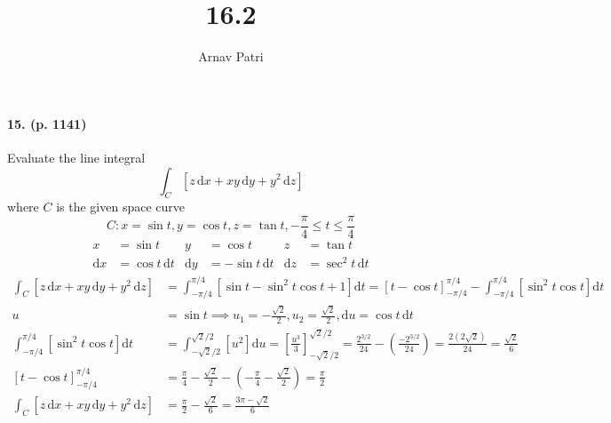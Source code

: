 \documentclass[A4, 12pt]{article}
\title{16.2}
\author{Arnav Patri}
\renewcommand{\d}{\mathrm{d}}
\begin{document}
	\maketitle
	\thispagestyle{empty}
	\paragraph{15. (p. 1141)}
		Evaluate the line integral
			\[\int_C\left[z\,\d x + xy\,\d y + y^2\,\d z\right]\]
			where $C$ is the given space curve
			\[C: x = \sin t, y = \cos t, z = \tan t, -\frac{\pi}{4} \le t \le \frac{\pi}{4}\]
		\begin{align*}
			x &= \sin t & y &= \cos t & z &= \tan t \\
			\d x &= \cos t\,\d t & \d y &= -\sin t\,\d t & \d z &= \sec^2 t\,\d t
		\end{align*}
		\begin{align*}
			\int_C\left[z\,\d x + xy\,\d y + y^2\,\d z\right] &= \int_{-\pi/4}^{\pi/4} \left[\sin t - \sin^2t\cos t+ 1\right]\d t
					= [t -\cos t]_{-\pi/4}^{\pi/4} - \int_{-\pi /4}^{\pi /4}\left[\sin^2 t\cos t\right]\d t \\
				u &= \sin t 
						\implies u_1 = -\frac{\sqrt{2}}{2}, u_2 = \frac{\sqrt{2}}{2}, \d u = \cos t\,\d t \\
				\int_{-\pi /4}^{\pi /4}\left[\sin^2 t\cos t\right]\d t &= \int_{-\sqrt{2}/2}^{\sqrt{2}/2} \left[u^2\right]\d u
						= \left[\frac{u^3}{3}\right]_{-\sqrt{2}/2}^{\sqrt{2}/2}
						= \frac{2^{3/2}}{24} - \left(\frac{-2^{3/2}}{24}\right)
						= \frac{2\left(2\sqrt{2}\right)}{24}
						= \frac{\sqrt{2}}{6} \\
				[t - \cos t]_{-\pi/4}^{\pi/4} &= \frac{\pi}{4} - \frac{\sqrt{2}}{2} - \left(-\frac{\pi}{4} - \frac{\sqrt{2}}{2}\right) 
				= \frac{\pi}{2} \\
			\int_C\left[z\,\d x + xy\,\d y + y^2\,\d z\right] &= \frac{\pi}{2} - \frac{\sqrt{2}}{6} 
					= \frac{3\pi - \sqrt{2}}{6}
		\end{align*}
\end{document}
